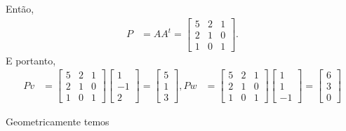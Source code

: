 \documentclass[a4paper,12pt, leqno, answers]{exam}
\begin{document}
\begin{questions}
\begin{parts}
\begin{solution}
            Ent\~{a}o,
            \begin{align*}
                P &= A A^t = \begin{bmatrix}
                    5 & 2 & 1 \\
                    2 & 1 & 0 \\
                    1 & 0 & 1
                \end{bmatrix}.
            \end{align*}
            E portanto,
            \begin{align*}
                P v &= \begin{bmatrix}
                    5 & 2 & 1 \\
                    2 & 1 & 0 \\
                    1 & 0 & 1
                \end{bmatrix} \begin{bmatrix}
                    1 \\
                    -1 \\
                    2
                \end{bmatrix} = \begin{bmatrix}
                    5 \\
                    1 \\
                    3
                \end{bmatrix},
                P w &= \begin{bmatrix}
                    5 & 2 & 1 \\
                    2 & 1 & 0 \\
                    1 & 0 & 1
                \end{bmatrix} \begin{bmatrix}
                    1 \\
                    1 \\
                    -1
                \end{bmatrix} = \begin{bmatrix}
                    6 \\
                    3 \\
                    0
                \end{bmatrix}
            \end{align*}

            Geometricamente temos
            \begin{center}
\end{center}
\end{solution}
\end{parts}
\end{questions}
\end{document}
